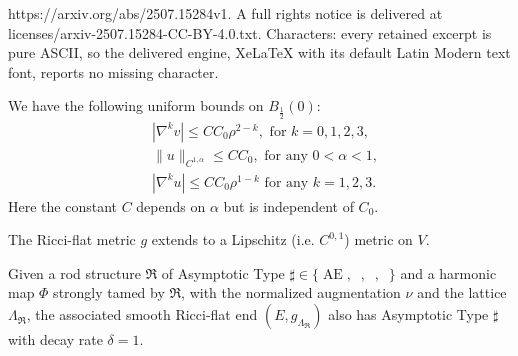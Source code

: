 \documentclass[10pt,a4paper]{amsart}
\DeclareMathOperator{\AFa}{AF_\beta}
\DeclareMathOperator{\ALFm}{ALF^{--}}
\DeclareMathOperator{\ALFp}{ALF^+}
\DeclareMathOperator{\Ae}{AE}
\newcommand{\mR} {\mathfrak R}
\begin{document}
https://arxiv.org/abs/2507.15284v1. A full rights notice is delivered at licenses/arxiv-2507.15284-CC-BY-4.0.txt. Characters: every retained excerpt is pure ASCII, so the delivered engine, XeLaTeX with its default Latin Modern text font, reports no missing character.
\begin{proposition}\label{thm:C11 regularity}
	We have the following uniform bounds on $B_{\frac{1}{2}}(0)$:
	\begin{align*}
		&|\nabla^{k}v|\leq CC_0\rho^{2-k},\text{ for $k=0,1,2,3$},\\
		&\|u\|_{C^{1,\alpha}}\leq CC_0,\text{ for any $0<\alpha<1$},\\
        &|\nabla^ku|\leq CC_0\rho^{1-k}\text{ for any $k=1,2,3$}.
	\end{align*}
    Here the constant $C$ depends on $\alpha$ but is independent of $C_0$.
\end{proposition}

\begin{lemma}\label{lem:Lipschitz metric}
	The Ricci-flat metric $g$ extends to a Lipschitz (i.e. $C^{0, 1}$) metric on $V$.
\end{lemma}

\begin{proposition}\label{prop:appendix 1}

    
    Given a rod structure $\mR$ of  Asymptotic Type  $\sharp\in\{\Ae,\ALFm,\ALFp, \AFa\}$ and a harmonic map $\Phi$ strongly tamed by $\mR$, with the normalized augmentation $\nu$ and the lattice $\Lambda_\mR$, the associated smooth Ricci-flat end $(E,g_{\Lambda_\mR})$ also has  Asymptotic Type  $\sharp$ with decay rate $\delta=1$.
\end{proposition}
\end{document}
